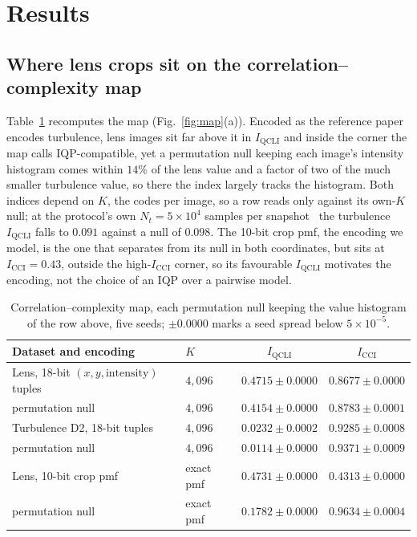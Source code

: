 \documentclass{article}
\newcommand{\qcli}{I_{\mathrm{QCLI}}}
\newcommand{\cci}{I_{\mathrm{CCI}}}
\begin{document}
\section{Results}
\label{sec:results}

\subsection{Where lens crops sit on the correlation--complexity map}
\label{sec:map}

Table~\ref{tab:map} recomputes the map (Fig.~\ref{fig:map}(a)). Encoded as the reference paper
encodes turbulence, lens images sit far above it in $\qcli$ and inside the corner the map calls
IQP-compatible, yet a permutation null keeping each image's intensity histogram comes within $14\%$
of the lens value and a factor of two of the much smaller turbulence value, so there the index
largely tracks the histogram. Both indices depend on $K$, the codes per image, so a row reads only
against its own-$K$ null; at the protocol's own $N_t = 5\times10^{4}$ samples per
snapshot~\cite{liu_2026_correlation} the turbulence $\qcli$ falls to $0.091$ against a null of
$0.098$. The 10-bit crop pmf, the encoding we model, is the one that separates from its null in both
coordinates, but sits at $\cci = 0.43$, outside the high-$\cci$ corner, so its favourable $\qcli$
motivates the encoding, not the choice of an IQP over a pairwise model.

\begin{table}[b]
\centering
\caption{Correlation--complexity map, each permutation null keeping the value histogram of the row
above, five seeds; $\pm 0.0000$ marks a seed spread below $5\times10^{-5}$.}
\label{tab:map}
\scriptsize
\begin{tabular}{llcc}
\toprule
Dataset and encoding & $K$ & $\qcli$ & $\cci$ \\
\midrule
Lens, 18-bit $(x, y, \mathrm{intensity})$ tuples & $4{,}096$ & $0.4715 \pm 0.0000$ & $0.8677 \pm 0.0000$ \\
\quad permutation null            & $4{,}096$ & $0.4154 \pm 0.0000$ & $0.8783 \pm 0.0001$ \\
Turbulence D2, 18-bit tuples       & $4{,}096$ & $0.0232 \pm 0.0002$ & $0.9285 \pm 0.0008$ \\
\quad permutation null            & $4{,}096$ & $0.0114 \pm 0.0000$ & $0.9371 \pm 0.0009$ \\
\midrule
Lens, 10-bit crop pmf              & exact pmf & $0.4731 \pm 0.0000$ & $0.4313 \pm 0.0000$ \\
\quad permutation null            & exact pmf & $0.1782 \pm 0.0000$ & $0.9634 \pm 0.0004$ \\
\bottomrule
\end{tabular}
\end{table}
\end{document}
